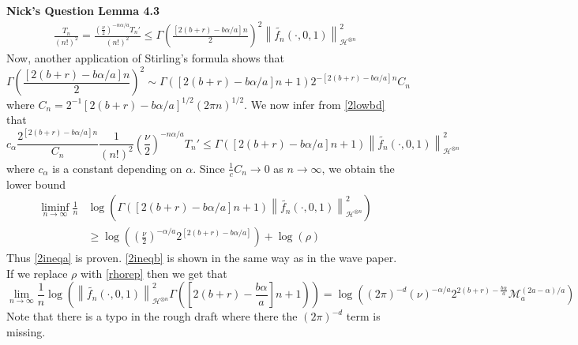 \documentclass[a4paper,11pt]{article}
\numberwithin{equation}{section}
\theoremstyle{plain}
\theoremstyle{definition}
\newcommand{\Norm}[1]{\left\|  #1   \right\|}
\newcounter{NQ}
\newenvironment{NickQuestion}[1][] %
{\refstepcounter{NQ}
	\begin{mdframed}[backgroundcolor=lightgray]\textbf{Nick's Question \theNQ \: #1~~}~~~\noindent}%
	{\end{mdframed}}
\numberwithin{NQ}{section}
\numberwithin{LQ}{section}
\numberwithin{ZQ}{section}
\begin{document}
\begin{NickQuestion}[Lemma 4.3]
		\begin{align}
		\frac{T_n}{(n!)^2} = \frac{\left( \frac{\nu}{2} \right)^{-n\alpha/a} T_n'}{(n!)^2}\le	\Gamma\left( \frac{[2(b + r ) -b \alpha / a]n}{2} \right)^2 	\Norm{ \tilde{f_n}(\cdot,0,1) }_{ \mathcal{H}^{\otimes n} }^2 \label{2lowbd}
		\end{align}
		Now, another application of Stirling's formula shows that
		\[
		\Gamma\left( \frac{[2(b + r ) -b \alpha / a]n}{2} \right)^2  \sim \Gamma\left( [2(b + r ) -b \alpha / a]n +1 \right)2^{- [2(b + r ) -b \alpha / a]n}C_n
		\]
		where $C_n = 2^{-1}[2(b + r ) -b \alpha / a]^{1/2}(2 \pi n )^{1/2}$. We now infer from \ref{2lowbd} that
		\[
		c_{\alpha} \frac{2^{[2(b + r ) -b \alpha / a]n}}{C_n} \frac{1}{(n!)^2}\left( \frac{\nu}{2} \right)^{-n\alpha/a}T_n' \le \Gamma\left( [2(b + r ) -b \alpha / a]n +1 \right) 	\Norm{ \tilde{f_n}(\cdot,0,1) }_{ \mathcal{H}^{\otimes n} }^2
		\]
		where $c_{\alpha}$ is a constant depending on $\alpha$. Since $\frac{1}{c}C_n \to 0$ as $n \to \infty$, we obtain the lower bound
		\begin{align*}
		\liminf_{n\to \infty} \frac{1}{n} &\log \left( \Gamma\left( [2(b + r ) -b \alpha / a]n +1 \right) 	\Norm{ \tilde{f_n}(\cdot,0,1) }_{ \mathcal{H}^{\otimes n} }^2  \right)
		\\ & \ge \log\left( \left( \frac{\nu}{2} \right)^{-\alpha/a} 2^{[2(b + r ) -b \alpha / a]} \right) + \log(\rho)
		\end{align*}
		Thus \ref{2ineqa} is proven. \ref{2ineqb} is shown in the same way as in the wave paper. If we replace $\rho$ with \ref{rhorep} then we get that
		\begin{equation}\label{43lim}
		\lim_{n \to \infty}  \frac{1}{n} \log \left( \Norm{ \tilde{f_n}(\cdot,0,1) }_{ \mathcal{H}^{\otimes n} }^2 \Gamma\left( \left[ 2(b+r)- \frac{b \alpha}{a} \right] n +1 \right) \right) = \log\left((2\pi)^{-d}\left(\nu \right)^{-\alpha/a}2^{2(b+r)-\frac{b\alpha}{a}} \mathcal{M}_a^{(2a-\alpha)/a}\right)
		\end{equation}
		Note that there is a typo in the rough draft where there the $(2\pi)^{-d}$ term is missing.
	\end{NickQuestion}
\end{document}
